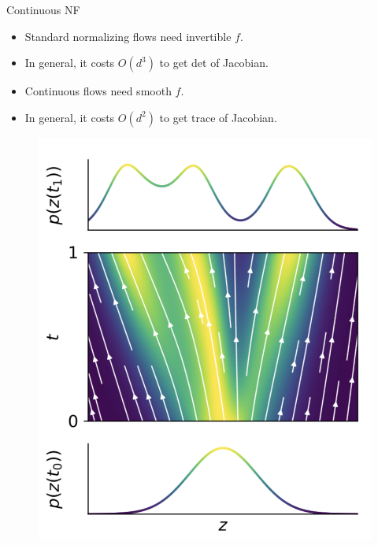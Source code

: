 \begin{frame}{Continuous NF}
	
	\begin{minipage}[t]{0.45\columnwidth}
		\begin{itemize}
			\item Standard normalizing flows need invertible $f$.
			\item In general, it costs $O(d^3)$ to get det of Jacobian.
			\item Continuous flows need smooth $f$.
			\item In general, it costs $O(d^2)$ to get trace of Jacobian.
		\end{itemize}
	\end{minipage}%
	\begin{minipage}[t]{0.55\columnwidth}
		\begin{figure}
			\centering
			\includegraphics[width=\linewidth]{figs/cnf_flow.png}
		\end{figure}
	\end{minipage}

\end{frame}
